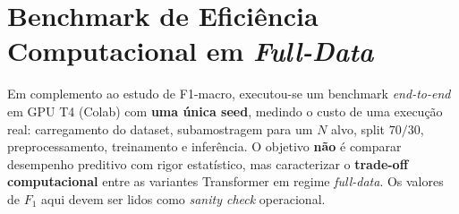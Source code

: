 \documentclass[12pt,a4paper]{article}
\begin{document}
\section{Benchmark de Eficiência Computacional em \emph{Full-Data}}
\label{sec:benchmark_full_data}

Em complemento ao estudo de F1-macro, executou-se um benchmark
\emph{end-to-end} em GPU T4 (Colab) com \textbf{uma única seed}, medindo o
custo de uma execução real: carregamento do dataset, subamostragem para um
$N$ alvo, split $70/30$, preprocessamento, treinamento e inferência. O
objetivo \textbf{não} é comparar desempenho preditivo com rigor estatístico,
mas caracterizar o \textbf{trade-off computacional} entre as variantes
Transformer em regime \emph{full-data}. Os valores de $F_1$ aqui devem ser
lidos como \emph{sanity check} operacional.
\end{document}

